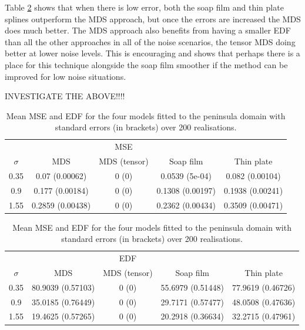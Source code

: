 Table \ref{wt2resultstable} shows that when there is low error, both the soap film and thin plate splines outperform the MDS approach, but once the errors are increased the MDS does much better. The MDS approach also benefits from having a smaller EDF than all the other approaches in all of the noise scenarios, the tensor MDS doing better at lower noise levels. This is encouraging and shows that perhaps there is a place for this technique alongside the soap film smoother if the method can be improved for low noise situations.

INVESTIGATE THE ABOVE!!!!

\begin{table}[ht]
\centering
\begin{tabular}{c c c c c}
 &  & MSE  & &\\ 
$\sigma$ & MDS & MDS (tensor) & Soap film & Thin plate\\ 
\hline
0.35  & 0.07 (0.00062) & 0 (0) & 0.0539 (5e-04) &0.082 (0.00104)\\
0.9  & 0.177 (0.00184) & 0 (0) & 0.1308 (0.00197) &0.1938 (0.00241)\\
1.55  & 0.2859 (0.00438) & 0 (0) & 0.2362 (0.00434) &0.3509 (0.00471)\\
\end{tabular}
\begin{tabular}{c c c c c}
 &  & EDF  & &\\ 
$\sigma$ & MDS & MDS (tensor) & Soap film & Thin plate\\ 
\hline
0.35 &80.9039 (0.57103) & 0 (0) & 55.6979 (0.51448) & 77.9619 (0.46726)\\ 
0.9 &35.0185 (0.76449) & 0 (0) & 29.7171 (0.57477) & 48.0508 (0.47636)\\ 
1.55 &19.4625 (0.57265) & 0 (0) & 20.2918 (0.36634) & 32.2715 (0.47961)\\ 
\end{tabular}

\caption{Mean MSE and EDF for the four models fitted to the peninsula domain with standard errors (in brackets) over 200 realisations.}
\label{wt2resultstable}
\end{table}

